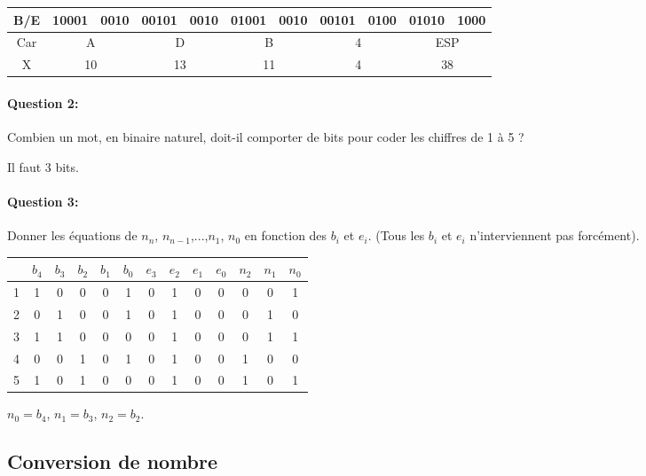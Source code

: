\begin{center}
\begin{tabular}{|c|c|c|c|c|c|c|c|c|c|c|}
\hline
B/E & 10001 & 0010 & 00101 & 0010 & 01001 & 0010 & 00101 & 0100 & 01010 & 1000 \\
\hline
Car & \multicolumn{2}{c|}{A} & \multicolumn{2}{c|}{D} & \multicolumn{2}{c|}{B} & \multicolumn{2}{c|}{4} & \multicolumn{2}{c|}{ESP} \\
\hline
X & \multicolumn{2}{c|}{10} & \multicolumn{2}{c|}{13} & \multicolumn{2}{c|}{11} & \multicolumn{2}{c|}{4} & \multicolumn{2}{c|}{38} \\
\hline
\end{tabular}
\end{center}

\paragraph{Question 2:} Combien un mot, en binaire naturel, doit-il comporter de bits pour coder les chiffres de 1 à 5 ? 

Il faut 3 bits.

\paragraph{Question 3:} Donner les équations de $n_n$, $n_{n-1}$,...,$n_1$, $n_0$ en fonction des $b_i$ et $e_i$. (Tous les $b_i$ et $e_i$ n'interviennent pas forcément). 

\begin{center}
\begin{tabular}{|c|c|c|c|c|c|c|c|c|c||c|c|c|}
\hline
 & $b_4$ & $b_3$ & $b_2$ & $b_1$ & $b_0$ & $e_3$ & $e_2$ & $e_1$ & $e_0$ & $n_2$ & $n_1$ & $n_0$ \\
\hline
1 & 1 & 0 & 0 & 0 & 1 & 0 & 1 & 0 & 0 & 0 & 0 & 1\\
\hline
2 & 0 & 1 & 0 & 0 & 1 & 0 & 1 & 0 & 0 & 0 & 1 & 0\\
\hline
3 & 1 & 1 & 0 & 0 & 0 & 0 & 1 & 0 & 0 & 0 & 1 & 1\\
\hline
4 & 0 & 0 & 1 & 0 & 1 & 0 & 1 & 0 & 0 & 1 & 0 & 0\\
\hline
5 & 1 & 0 & 1 & 0 & 0 & 0 & 1 & 0 & 0 & 1 & 0 & 1 \\
\hline
\end{tabular}
\end{center}

$n_0=b_4$, $n_1=b_3$, $n_2=b_2$.

\subsection{Conversion de nombre}

